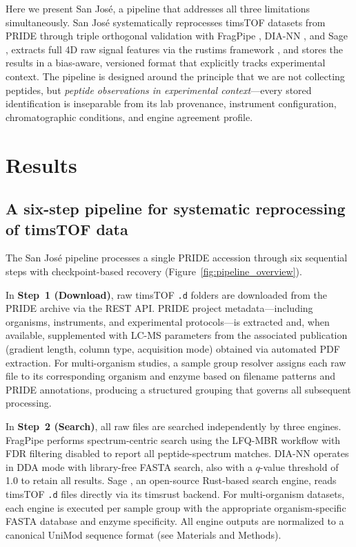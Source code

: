 \documentclass[10pt,twoside]{article}
\begin{document}
Here we present San Jos\'{e}, a pipeline that addresses all three limitations simultaneously.
San Jos\'{e} systematically reprocesses timsTOF datasets from PRIDE through triple orthogonal validation with FragPipe \cite{kong_msfragger_2017}, DIA-NN \cite{demichev_diann_2020}, and Sage \cite{lazear_sage_2023}, extracts full 4D raw signal features via the rustims framework \cite{teschner_rustims_2025}, and stores the results in a bias-aware, versioned format that explicitly tracks experimental context.
The pipeline is designed around the principle that we are not collecting peptides, but \textit{peptide observations in experimental context}---every stored identification is inseparable from its lab provenance, instrument configuration, chromatographic conditions, and engine agreement profile.

\section{Results}

\subsection*{A six-step pipeline for systematic reprocessing of timsTOF data}

The San Jos\'{e} pipeline processes a single PRIDE accession through six sequential steps with checkpoint-based recovery (Figure~\ref{fig:pipeline_overview}).

In \textbf{Step~1 (Download)}, raw timsTOF \texttt{.d} folders are downloaded from the PRIDE archive via the REST API.
PRIDE project metadata---including organisms, instruments, and experimental protocols---is extracted and, when available, supplemented with LC-MS parameters from the associated publication (gradient length, column type, acquisition mode) obtained via automated PDF extraction.
For multi-organism studies, a sample group resolver assigns each raw file to its corresponding organism and enzyme based on filename patterns and PRIDE annotations, producing a structured grouping that governs all subsequent processing.

In \textbf{Step~2 (Search)}, all raw files are searched independently by three engines.
FragPipe \cite{kong_msfragger_2017} performs spectrum-centric search using the LFQ-MBR workflow with FDR filtering disabled to report all peptide-spectrum matches.
DIA-NN \cite{demichev_diann_2020} operates in DDA mode with library-free FASTA search, also with a $q$-value threshold of 1.0 to retain all results.
Sage \cite{lazear_sage_2023}, an open-source Rust-based search engine, reads timsTOF \texttt{.d} files directly via its timsrust backend.
For multi-organism datasets, each engine is executed per sample group with the appropriate organism-specific FASTA database and enzyme specificity.
All engine outputs are normalized to a canonical UniMod sequence format (see Materials and Methods).
\end{document}
